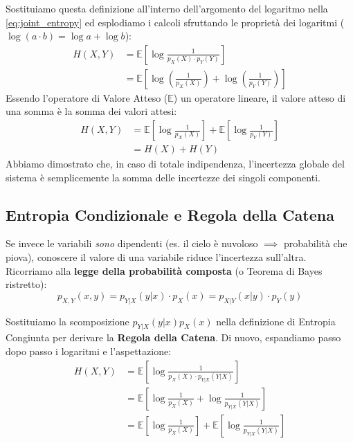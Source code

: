 Sostituiamo questa definizione all'interno dell'argomento del logaritmo nella \ref{eq:joint_entropy} ed esplodiamo i calcoli sfruttando le proprietà dei logaritmi ($\log(a \cdot b) = \log a + \log b$):
\begin{align}
H(X, Y) &= \mathbb{E} \left[ \log \frac{1}{p_X(X) \cdot p_Y(Y)} \right] \nonumber \\
        &= \mathbb{E} \left[ \log \left( \frac{1}{p_X(X)} \right) + \log \left( \frac{1}{p_Y(Y)} \right) \right]
\end{align}
Essendo l'operatore di Valore Atteso ($\mathbb{E}$) un operatore lineare, il valore atteso di una somma è la somma dei valori attesi:
\begin{align}
H(X,Y)  &= \mathbb{E} \left[ \log \frac{1}{p_X(X)} \right] + \mathbb{E} \left[ \log \frac{1}{p_Y(Y)} \right] \nonumber \\
        &= H(X) + H(Y)
\end{align}
Abbiamo dimostrato che, in caso di totale indipendenza, l'incertezza globale del sistema è semplicemente la somma delle incertezze dei singoli componenti.

\subsection{Entropia Condizionale e Regola della Catena}

Se invece le variabili \textit{sono} dipendenti (es. il cielo è nuvoloso $\implies$ probabilità che piova), conoscere il valore di una variabile riduce l'incertezza sull'altra.
Ricorriamo alla \textbf{legge della probabilità composta} (o Teorema di Bayes ristretto):
\begin{equation}
p_{X,Y}(x,y) = p_{Y|X}(y|x) \cdot p_X(x) = p_{X|Y}(x|y) \cdot p_Y(y)
\end{equation}

Sostituiamo la scomposizione $p_{Y|X}(y|x) p_X(x)$ nella definizione di Entropia Congiunta per derivare la \textbf{Regola della Catena}. Di nuovo, espandiamo passo dopo passo i logaritmi e l'aspettazione:
\begin{align}
H(X, Y) &= \mathbb{E} \left[ \log \frac{1}{p_X(X) \cdot p_{Y|X}(Y|X)} \right] \nonumber \\
        &= \mathbb{E} \left[ \log \frac{1}{p_X(X)} + \log \frac{1}{p_{Y|X}(Y|X)} \right] \nonumber \\
        &= \mathbb{E} \left[ \log \frac{1}{p_X(X)} \right] + \mathbb{E} \left[ \log \frac{1}{p_{Y|X}(Y|X)} \right]
\end{align}

